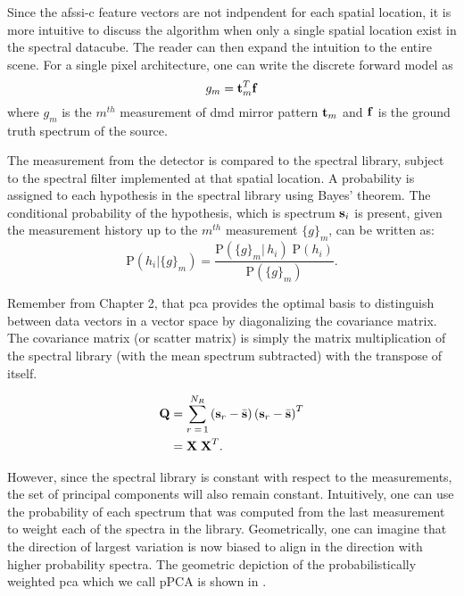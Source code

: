 Since the \gls{afssi-c} feature vectors are not indpendent for each spatial location, it is more intuitive to discuss the algorithm when only a single spatial location exist in the spectral datacube. The reader can then expand the intuition to the entire scene. For a single pixel architecture, one can write the discrete forward model as
%
\begin{equation}
g_m = \mathbf{t}_{m}^{T} \mathbf{f}
\end{equation}
%
where $g_m$ is the $m^{th}$ measurement of \gls{dmd} mirror pattern $\mathbf{t}_m$ and $\mathbf{f}$ is the ground truth spectrum of the source. 

The measurement from the detector is compared to the spectral library, subject to the spectral filter implemented at that spatial location. A probability is assigned to each hypothesis in the spectral library using Bayes' theorem. The conditional probability of the hypothesis, which is spectrum $\mathbf{s}_i$ is present, given the measurement history up to the $m^{th}$ measurement $\{g\}_m$, can be written as:
%
\begin{equation}\label{eq:BayesThm2}
\mbox{P} \left( h_i | \{ g \}_m \right) = \frac{\mbox{P} \left( \{g\}_m |\, h_i \right) \; \mbox{P} \left(h_i\right)}{\mbox{P} \left( \{g\}_m \right)}.
\end{equation}



Remember from Chapter 2, that \gls{pca} provides the optimal basis to distinguish between data vectors in a vector space by diagonalizing the covariance matrix. The covariance matrix (or scatter matrix) is simply the matrix multiplication of the spectral library (with the mean spectrum subtracted) with the transpose of itself. 

\begin{align}
\textbf{Q} &= \sum^{N_{R}}_{r \;= \,1} \left(\textbf{s}_r - \bar{\textbf{s}} \right) \left(\textbf{s}_r - \bar{\textbf{s}} \right)^T \notag \\
&=\textbf{X}\;\textbf{X}^T. \label{eq:nonweightedScatter}
\end{align}

However, since the spectral library is constant with respect to the measurements, the set of principal components will also remain constant. Intuitively, one can use the probability of each spectrum that was computed from the last measurement to weight each of the spectra in the library. Geometrically, one can imagine that the direction of largest variation is now biased to align in the direction with higher probability spectra. The geometric depiction of the probabilistically weighted \acrfull{pca} which we call pPCA is shown in .

